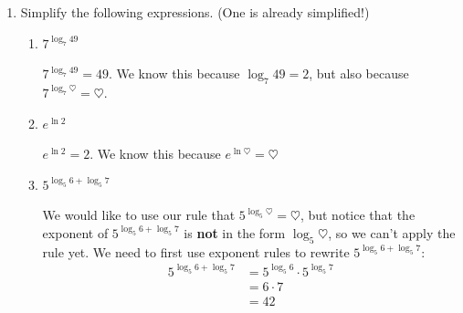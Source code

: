 \documentclass{article}
\begin{document}
\begin{enumerate}[resume]
\item  \label{simplify-exp-of-log-expressions-1}

  Simplify the following expressions. (One is already simplified!)

  \begin{enumerate}

  \item


    \begin{problem}[\vfill]
      $7^{\log_7 49}$
    \end{problem}

    \begin{solution}
      $7^{\log_7 49}=49$. We know this because $\log_7 49 = 2$, 
      but also because $7^{\log_7 \heartsuit} = \heartsuit$.
    \end{solution}

  \item
    \begin{problem}[\vfill]
      $e^{\ln 2}$
    \end{problem}

    \begin{solution}
      $e^{\ln 2}=2$. We know this because $e^{\ln \heartsuit} =
      \heartsuit$
    \end{solution}

  \item


    \begin{problem}[\vfill]
      $5^{\log_5 6 + \log_5 7}$
    \end{problem}

    \begin{solution}
      We would like to use our rule that 
      $5^{\log_5 \heartsuit} = \heartsuit$, but notice that
      the exponent of $5^{\log_5 6 + \log_5 7}$ is \textbf{not} in
      the form $\log_5 \heartsuit$, so we can't apply the rule yet.
      We need to first use exponent rules to rewrite
      $5^{\log_5 6 + \log_5 7}$:
      \begin{align*}
        5^{\log_5 6 + \log_5 7} &= 5^{\log_5 6} \cdot 5^{\log_5 7} \\
        &= 6 \cdot 7 \\
        &= 42
      \end{align*}
    \end{solution}


\end{enumerate}
\end{enumerate}
\end{document}
